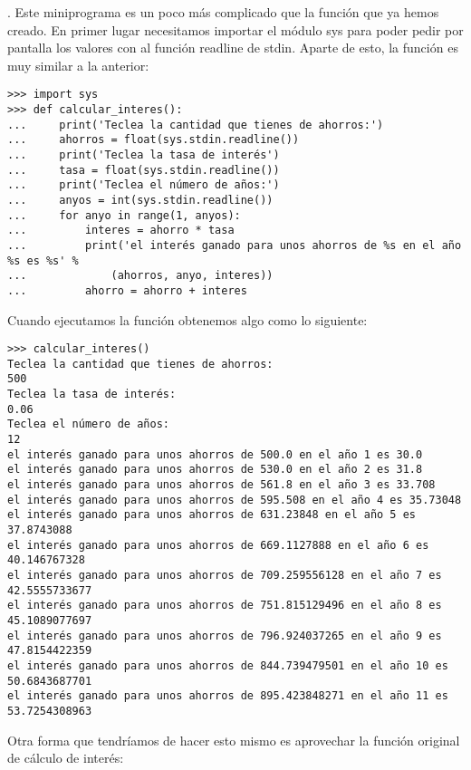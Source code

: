 . Este miniprograma es un poco más complicado que la función que ya hemos creado.   En primer lugar necesitamos importar el módulo sys para poder pedir por pantalla los valores con al función readline de stdin.   Aparte de esto, la función es muy similar a la anterior:

\begin{listing}
\begin{verbatim}
>>> import sys
>>> def calcular_interes():
...     print('Teclea la cantidad que tienes de ahorros:')
...     ahorros = float(sys.stdin.readline())
...     print('Teclea la tasa de interés')
...     tasa = float(sys.stdin.readline())
...     print('Teclea el número de años:')
...     anyos = int(sys.stdin.readline())
...     for anyo in range(1, anyos):
...         interes = ahorro * tasa
...         print('el interés ganado para unos ahorros de %s en el año %s es %s' % 
...             (ahorros, anyo, interes))
...         ahorro = ahorro + interes
\end{verbatim}
\end{listing}

\noindent
Cuando ejecutamos la función obtenemos algo como lo siguiente:

\begin{listingignore}
\begin{verbatim}
>>> calcular_interes()
Teclea la cantidad que tienes de ahorros:
500
Teclea la tasa de interés:
0.06
Teclea el número de años:
12
el interés ganado para unos ahorros de 500.0 en el año 1 es 30.0
el interés ganado para unos ahorros de 530.0 en el año 2 es 31.8
el interés ganado para unos ahorros de 561.8 en el año 3 es 33.708
el interés ganado para unos ahorros de 595.508 en el año 4 es 35.73048
el interés ganado para unos ahorros de 631.23848 en el año 5 es 37.8743088
el interés ganado para unos ahorros de 669.1127888 en el año 6 es 40.146767328
el interés ganado para unos ahorros de 709.259556128 en el año 7 es 42.5555733677
el interés ganado para unos ahorros de 751.815129496 en el año 8 es 45.1089077697
el interés ganado para unos ahorros de 796.924037265 en el año 9 es 47.8154422359
el interés ganado para unos ahorros de 844.739479501 en el año 10 es 50.6843687701
el interés ganado para unos ahorros de 895.423848271 en el año 11 es 53.7254308963
\end{verbatim}
\end{listingignore}

\noindent
Otra forma que tendríamos de hacer esto mismo es aprovechar la función original de cálculo de interés:

